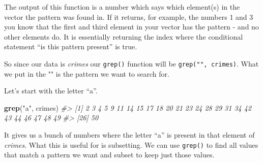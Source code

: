 \documentclass[
  12pt,
]{book}
\newenvironment{Shaded}{\begin{snugshade}}{\end{snugshade}}
\newcommand{\CommentTok}[1]{\textcolor[rgb]{0.56,0.35,0.01}{\textit{#1}}}
\newcommand{\KeywordTok}[1]{\textcolor[rgb]{0.13,0.29,0.53}{\textbf{#1}}}
\newcommand{\NormalTok}[1]{#1}
\newcommand{\StringTok}[1]{\textcolor[rgb]{0.31,0.60,0.02}{#1}}
\begin{document}
The output of this function is a number which says which element(s) in the vector the pattern was found in. If it returns, for example, the numbers 1 and 3 you know that the first and third element in your vector has the pattern - and no other elements do. It is essentially returning the index where the conditional statement ``is this pattern present'' is true.

So since our data is \emph{crimes} our \texttt{grep()} function will be \texttt{grep("",\ crimes)}. What we put in the "" is the pattern we want to search for.

Let's start with the letter ``a''.

\begin{Shaded}
\begin{Highlighting}[]
\KeywordTok{grep}\NormalTok{(}\StringTok{"a"}\NormalTok{, crimes)}
\CommentTok{\#>  [1]  2  3  4  5  9 11 14 15 17 18 20 21 23 24 28 29 31 34 42 43 44 46 47 48 49}
\CommentTok{\#> [26] 50}
\end{Highlighting}
\end{Shaded}

It gives us a bunch of numbers where the letter ``a'' is present in that element of \emph{crimes}. What this is useful for is subsetting. We can use \texttt{grep()} to find all values that match a pattern we want and subset to keep just those values.
\end{document}
